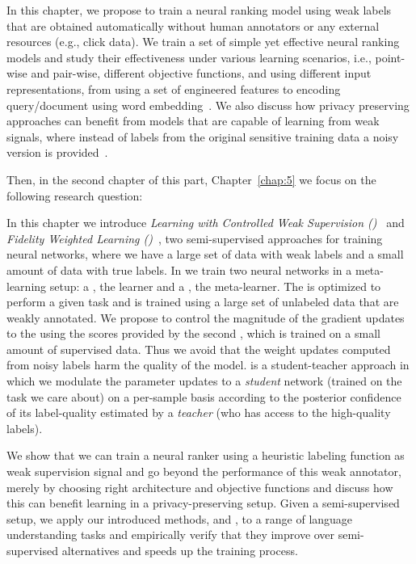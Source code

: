 In this chapter, we propose to train a neural ranking model using weak labels that are obtained automatically without human annotators or any external resources (e.g., click data). We train a set of simple yet effective neural ranking models and study their effectiveness under various learning scenarios, i.e., point-wise and pair-wise, different objective functions, and using different input representations, from using a set of engineered features to encoding query/document using word embedding~\citep{Dehghani:2017:SIGIR}. We also discuss how privacy preserving approaches can benefit from models that are capable of learning from weak signals, where instead of labels from the original sensitive training data a noisy version is provided~\citep{dehghani:2017:neuir}.

Then, in the second chapter of this part, Chapter~\ref{chap:5} we focus on the following research question:

In this chapter we introduce \emph{Learning with Controlled Weak Supervision (\cws)}~\cite{Dehghani:2017:nips_metalearn, Dehghani:2017avoiding} and \emph{Fidelity Weighted Learning (\fwl)}~\citep{dehghani:2018:ICLR,Dehghani:2019:ICLR-LLD}, two semi-supervised approaches for training neural networks, where we have a large set of data with weak labels and a small amount of data with true labels. 
%
In \cws we train two neural networks in a meta-learning setup: a \tnet, the learner and a \cnet, the meta-learner.  The \tnet is optimized to perform a given task and is trained using a large set of unlabeled data that are weakly annotated. We propose to control the magnitude of the gradient updates to the \tnet using the scores provided by the second \cnet, which is trained on a small amount of supervised data. Thus we avoid that the weight updates computed from noisy labels harm the quality of the \tnet model.
%
\fwl is a student-teacher approach in which we modulate the parameter updates to a \emph{student} network (trained on the task we care about) on a per-sample basis according to the posterior confidence of its label-quality estimated by a \emph{teacher} (who has access to the high-quality labels).  


We show that we can train a neural ranker using a heuristic labeling function as weak supervision signal and go beyond the performance of this weak annotator, merely by choosing right architecture and objective functions and discuss how this can benefit learning in a privacy-preserving setup.
Given a semi-supervised setup, we apply our introduced methods, \cws and \fwl, to a range of language understanding tasks and empirically verify that they improve over semi-supervised alternatives and speeds up the training process. 

\medskip


